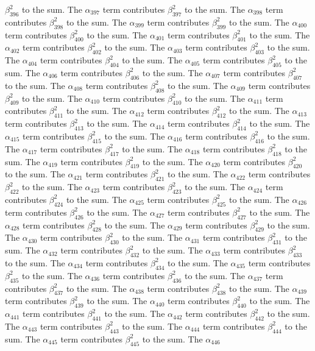 \begin{lemma}
$\beta_{396}^{2}$ to the sum. The $\alpha_{397}$ term contributes $\beta_{397}^{2}$ to the sum. The $\alpha_{398}$ term contributes $\beta_{398}^{2}$ to the sum. The $\alpha_{399}$ term contributes $\beta_{399}^{2}$ to the sum. The $\alpha_{400}$ term contributes $\beta_{400}^{2}$ to the sum. The $\alpha_{401}$ term contributes $\beta_{401}^{2}$ to the sum. The $\alpha_{402}$ term contributes $\beta_{402}^{2}$ to the sum. The $\alpha_{403}$ term contributes $\beta_{403}^{2}$ to the sum. The $\alpha_{404}$ term contributes $\beta_{404}^{2}$ to the sum. The $\alpha_{405}$ term contributes $\beta_{405}^{2}$ to the sum. The $\alpha_{406}$ term contributes $\beta_{406}^{2}$ to the sum. The $\alpha_{407}$ term contributes $\beta_{407}^{2}$ to the sum. The $\alpha_{408}$ term contributes $\beta_{408}^{2}$ to the sum. The $\alpha_{409}$ term contributes $\beta_{409}^{2}$ to the sum. The $\alpha_{410}$ term contributes $\beta_{410}^{2}$ to the sum. The $\alpha_{411}$ term contributes $\beta_{411}^{2}$ to the sum. The $\alpha_{412}$ term contributes $\beta_{412}^{2}$ to the sum. The $\alpha_{413}$ term contributes $\beta_{413}^{2}$ to the sum. The $\alpha_{414}$ term contributes $\beta_{414}^{2}$ to the sum. The $\alpha_{415}$ term contributes $\beta_{415}^{2}$ to the sum. The $\alpha_{416}$ term contributes $\beta_{416}^{2}$ to the sum. The $\alpha_{417}$ term contributes $\beta_{417}^{2}$ to the sum. The $\alpha_{418}$ term contributes $\beta_{418}^{2}$ to the sum. The $\alpha_{419}$ term contributes $\beta_{419}^{2}$ to the sum. The $\alpha_{420}$ term contributes $\beta_{420}^{2}$ to the sum. The $\alpha_{421}$ term contributes $\beta_{421}^{2}$ to the sum. The $\alpha_{422}$ term contributes $\beta_{422}^{2}$ to the sum. The $\alpha_{423}$ term contributes $\beta_{423}^{2}$ to the sum. The $\alpha_{424}$ term contributes $\beta_{424}^{2}$ to the sum. The $\alpha_{425}$ term contributes $\beta_{425}^{2}$ to the sum. The $\alpha_{426}$ term contributes $\beta_{426}^{2}$ to the sum. The $\alpha_{427}$ term contributes $\beta_{427}^{2}$ to the sum. The $\alpha_{428}$ term contributes $\beta_{428}^{2}$ to the sum. The $\alpha_{429}$ term contributes $\beta_{429}^{2}$ to the sum. The $\alpha_{430}$ term contributes $\beta_{430}^{2}$ to the sum. The $\alpha_{431}$ term contributes $\beta_{431}^{2}$ to the sum. The $\alpha_{432}$ term contributes $\beta_{432}^{2}$ to the sum. The $\alpha_{433}$ term contributes $\beta_{433}^{2}$ to the sum. The $\alpha_{434}$ term contributes $\beta_{434}^{2}$ to the sum. The $\alpha_{435}$ term contributes $\beta_{435}^{2}$ to the sum. The $\alpha_{436}$ term contributes $\beta_{436}^{2}$ to the sum. The $\alpha_{437}$ term contributes $\beta_{437}^{2}$ to the sum. The $\alpha_{438}$ term contributes $\beta_{438}^{2}$ to the sum. The $\alpha_{439}$ term contributes $\beta_{439}^{2}$ to the sum. The $\alpha_{440}$ term contributes $\beta_{440}^{2}$ to the sum. The $\alpha_{441}$ term contributes $\beta_{441}^{2}$ to the sum. The $\alpha_{442}$ term contributes $\beta_{442}^{2}$ to the sum. The $\alpha_{443}$ term contributes $\beta_{443}^{2}$ to the sum. The $\alpha_{444}$ term contributes $\beta_{444}^{2}$ to the sum. The $\alpha_{445}$ term contributes $\beta_{445}^{2}$ to the sum. The $\alpha_{446}$ 
\end{lemma}
